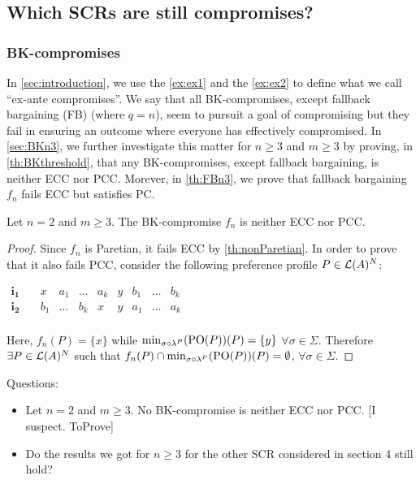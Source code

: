 \documentclass[version=3.21, pagesize, twoside=off, bibliography=totoc, DIV=calc, fontsize=12pt, a4paper]{scrartcl}
\begin{document}
\subsection{Which SCRs are still compromises?}

\subsubsection{BK-compromises}
In \cref{sec:introduction}, we use the \cref{ex:ex1} and the \cref{ex:ex2} to define what we call “ex-ante compromises”. We say that all BK-compromises, except fallback bargaining (FB) (where $q=n$), seem to pursuit a goal of compromising but they fail in ensuring an outcome where everyone has effectively compromised. In \cref{sec:BKn3}, we further investigate this matter for $n\geq3$ and $m\geq3$ by proving, in \cref{th:BKthreshold}, that any BK-compromises, except fallback bargaining, is neither ECC nor PCC. Morever, in \cref{th:FBn3}, we prove that fallback bargaining $f_{n}$ fails ECC but satisfies PC.

\begin{Theorem}
	Let $n=2$ and $m\geq3$. The BK-compromise $f_{n}$ is neither ECC nor PCC. 
\end{Theorem}

\begin{proof}
	Since $f_{n}$ is Paretian, it fails ECC by \cref{th:nonParetian}. In order to prove that it also fails PCC, consider the following preference profile $P\in \mathcal{L}(A)^{N}$:
\begin{center}
	$
	\begin{array}{cccccccccc}
	\mathbf{i_1} \quad &x&a_1&\dots&a_k&y&b_1&\dots&b_k\\
	\mathbf{i_2} \quad &b_1&\dots&b_{k}&x&y&a_1&\dots&a_k\\
	\end{array}
	$
\end{center}
Here, $f_n(P)=\{x\}$ while $\mustar(P)=\{y\}$ $\forall \sigma \in \Sigma$. Therefore $\exists P \in  \mathcal{L}(A)^{N}$ such that $f_n(P) \cap \mustar(P) = \emptyset$, $\forall \sigma \in \Sigma$.
\end{proof}


Questions:
\begin{itemize}
	\item Let $n=2$ and $m\geq3$. No BK-compromise  is neither ECC nor PCC. [I suspect. ToProve]
	\item Do the results we got for $n\geq3$ for the other SCR considered in section 4 still hold?
\end{itemize}
\end{document}
